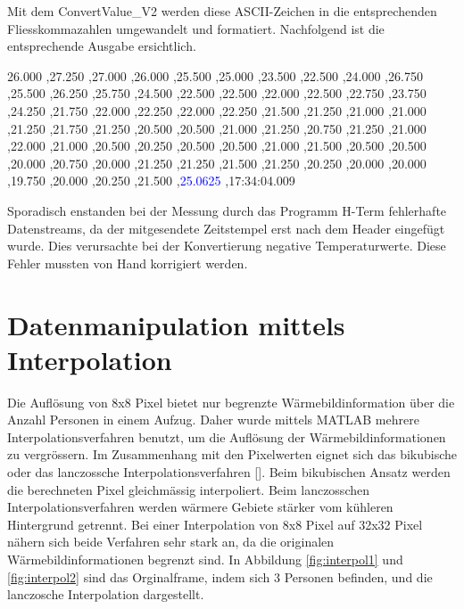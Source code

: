 Mit dem ConvertValue\_V2 werden diese \ac{ASCII}-Zeichen in die entsprechenden Fliesskommazahlen umgewandelt und formatiert. Nachfolgend ist die entsprechende Ausgabe ersichtlich.

26.000 ,27.250 ,27.000 ,26.000 ,25.500 ,25.000 ,23.500 ,22.500 ,24.000 ,26.750 ,25.500 ,26.250 ,25.750 ,24.500 ,22.500 ,22.500 ,22.000 ,22.500 ,22.750 ,23.750 ,24.250 ,21.750 ,22.000 ,22.250 ,22.000 ,22.250 ,21.500 ,21.250 ,21.000 ,21.000 ,21.250 ,21.750 ,21.250 ,20.500 ,20.500 ,21.000 ,21.250 ,20.750 ,21.250 ,21.000 ,22.000 ,21.000 ,20.500 ,20.250 ,20.500 ,20.500 ,21.000 ,21.500 ,20.500 ,20.500 ,20.000 ,20.750 ,20.000 ,21.250 ,21.250 ,21.500 ,21.250 ,20.250 ,20.000 ,20.000 ,19.750 ,20.000 ,20.250 ,21.500 ,\textcolor{blue}{25.0625} ,17:34:04.009

Sporadisch enstanden bei der Messung durch das Programm H-Term fehlerhafte Datenstreams, da der mitgesendete Zeitstempel erst nach dem Header eingefügt wurde. Dies verursachte bei der Konvertierung negative Temperaturwerte.  Diese Fehler mussten von Hand korrigiert werden. 


\section{Datenmanipulation mittels Interpolation}

Die Auflösung von 8x8 Pixel bietet nur begrenzte Wärmebildinformation über die Anzahl Personen in einem Aufzug. Daher wurde mittels MATLAB mehrere Interpolationsverfahren benutzt, um die Auflösung der Wärmebildinformationen zu vergrössern. Im Zusammenhang mit den Pixelwerten eignet sich das bikubische oder das lanczossche Interpolationsverfahren [\protect\cite{Interpol}]. Beim bikubischen Ansatz werden die berechneten Pixel gleichmässig interpoliert. Beim lanczosschen Interpolationsverfahren werden wärmere Gebiete stärker vom kühleren Hintergrund getrennt. Bei einer Interpolation von 8x8 Pixel auf 32x32 Pixel nähern sich beide Verfahren sehr stark an, da die originalen Wärmebildinformationen begrenzt sind. In Abbildung \ref{fig:interpol1} und \ref{fig:interpol2} sind das Orginalframe, indem sich 3 Personen befinden, und die lanczosche Interpolation dargestellt.


